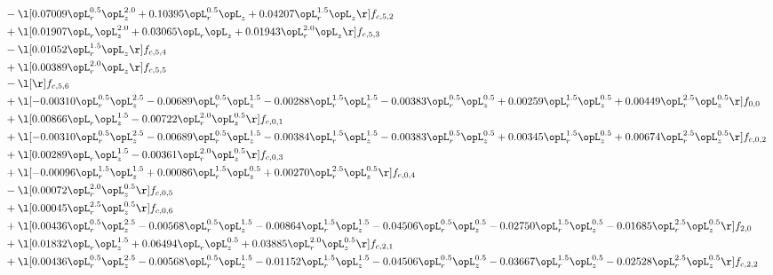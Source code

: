 \begin{alignat}{2}
& - \l[  0.07009 \opL_r^{0.5} \opL_z^{2.0} +  0.10395 \opL_r^{0.5} \opL_z +  0.04207 \opL_r^{1.5} \opL_z  \r] f_{c,5,2} \nonumber \\ 
& + \l[  0.01907 \opL_r \opL_z^{2.0} +  0.03065 \opL_r \opL_z +  0.01943 \opL_r^{2.0} \opL_z  \r] f_{c,5,3} \nonumber \\ 
& - \l[  0.01052 \opL_r^{1.5} \opL_z  \r] f_{c,5,4} \nonumber \\ 
& + \l[  0.00389 \opL_r^{2.0} \opL_z  \r] f_{c,5,5} \nonumber \\ 
& - \l[  \r] f_{c,5,6} \nonumber \\ 
& + \l[  -0.00310 \opL_r^{0.5} \opL_z^{2.5}   -0.00689 \opL_r^{0.5} \opL_z^{1.5}   -0.00288 \opL_r^{1.5} \opL_z^{1.5}   -0.00383 \opL_r^{0.5} \opL_z^{0.5} +  0.00259 \opL_r^{1.5} \opL_z^{0.5} +  0.00449 \opL_r^{2.5} \opL_z^{0.5}  \r] f_{0,0} \nonumber \\ 
& + \l[  0.00866 \opL_r \opL_z^{1.5}   -0.00722 \opL_r^{2.0} \opL_z^{0.5}  \r] f_{c,0,1} \nonumber \\ 
& + \l[  -0.00310 \opL_r^{0.5} \opL_z^{2.5}   -0.00689 \opL_r^{0.5} \opL_z^{1.5}   -0.00384 \opL_r^{1.5} \opL_z^{1.5}   -0.00383 \opL_r^{0.5} \opL_z^{0.5} +  0.00345 \opL_r^{1.5} \opL_z^{0.5} +  0.00674 \opL_r^{2.5} \opL_z^{0.5}  \r] f_{c,0,2} \nonumber \\ 
& + \l[  0.00289 \opL_r \opL_z^{1.5}   -0.00361 \opL_r^{2.0} \opL_z^{0.5}  \r] f_{c,0,3} \nonumber \\ 
& + \l[  -0.00096 \opL_r^{1.5} \opL_z^{1.5} +  0.00086 \opL_r^{1.5} \opL_z^{0.5} +  0.00270 \opL_r^{2.5} \opL_z^{0.5}  \r] f_{c,0,4} \nonumber \\ 
& - \l[  0.00072 \opL_r^{2.0} \opL_z^{0.5}  \r] f_{c,0,5} \nonumber \\ 
& + \l[  0.00045 \opL_r^{2.5} \opL_z^{0.5}  \r] f_{c,0,6} \nonumber \\ 
& + \l[  0.00436 \opL_r^{0.5} \opL_z^{2.5}   -0.00568 \opL_r^{0.5} \opL_z^{1.5}   -0.00864 \opL_r^{1.5} \opL_z^{1.5}   -0.04506 \opL_r^{0.5} \opL_z^{0.5}   -0.02750 \opL_r^{1.5} \opL_z^{0.5}   -0.01685 \opL_r^{2.5} \opL_z^{0.5}  \r] f_{2,0} \nonumber \\ 
& + \l[  0.01832 \opL_r \opL_z^{1.5} +  0.06494 \opL_r \opL_z^{0.5} +  0.03885 \opL_r^{2.0} \opL_z^{0.5}  \r] f_{c,2,1} \nonumber \\ 
& + \l[  0.00436 \opL_r^{0.5} \opL_z^{2.5}   -0.00568 \opL_r^{0.5} \opL_z^{1.5}   -0.01152 \opL_r^{1.5} \opL_z^{1.5}   -0.04506 \opL_r^{0.5} \opL_z^{0.5}   -0.03667 \opL_r^{1.5} \opL_z^{0.5}   -0.02528 \opL_r^{2.5} \opL_z^{0.5}  \r] f_{c,2,2} \nonumber \\ 

\end{alignat}
